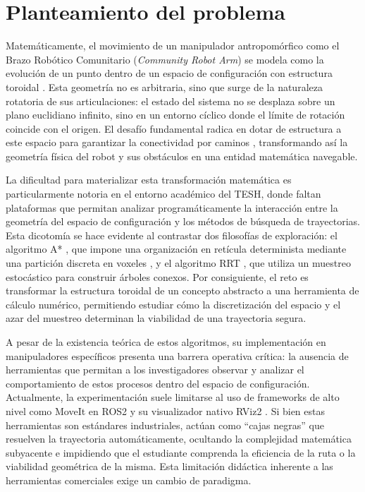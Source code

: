 \section{Planteamiento del problema}

Matemáticamente, el movimiento de un manipulador antropomórfico como el 
Brazo Robótico Comunitario (\textit{Community Robot Arm}) \parencite{community_robot_arm_20sffactory} se modela como la evolución de un punto dentro de un 
espacio de configuración con estructura toroidal \parencite{Munkres2000}. 
Esta geometría no es arbitraria, sino que surge de la naturaleza rotatoria 
de sus articulaciones: el estado del sistema no se desplaza sobre un plano 
euclidiano infinito, sino en un entorno cíclico donde el límite de rotación 
coincide con el origen. El desafío fundamental radica en dotar de estructura 
a este espacio para garantizar la conectividad 
por caminos \parencite{Munkres2000}, transformando así la geometría física 
del robot y sus obstáculos en una entidad matemática navegable.

La dificultad para materializar esta transformación matemática 
es particularmente notoria en el entorno académico del TESH, 
donde faltan plataformas que permitan analizar programáticamente 
la interacción entre la geometría del espacio de 
configuración y los métodos de búsqueda de trayectorias. Esta dicotomía 
se hace evidente al contrastar dos filosofías de exploración: el 
algoritmo A* \parencite{Hart1968}, que impone una organización en 
retícula determinista mediante una partición discreta en 
voxeles \parencite{Choset2005}, y el algoritmo RRT \parencite{LaValle1998}, 
que utiliza un muestreo estocástico para construir árboles conexos. 
Por consiguiente, el reto es transformar la estructura toroidal de un 
concepto abstracto a una herramienta de cálculo numérico, permitiendo 
estudiar cómo la discretización del espacio y el azar del muestreo determinan 
la viabilidad de una trayectoria segura.

A pesar de la existencia teórica de estos algoritmos, su implementación 
en manipuladores específicos presenta una barrera operativa crítica: 
la ausencia de herramientas que permitan a los investigadores observar 
y analizar el comportamiento de estos procesos dentro del espacio de 
configuración. Actualmente, la experimentación suele limitarse al uso de 
frameworks de alto nivel como MoveIt en ROS2 \parencite{macenski2022robot} y su visualizador nativo RViz2 \parencite{rviz2_software}. Si bien estas herramientas 
son estándares industriales, actúan como \enquote{cajas negras} que resuelven la 
trayectoria automáticamente, ocultando la complejidad matemática subyacente 
e impidiendo que el estudiante comprenda la eficiencia de la ruta o la 
viabilidad geométrica de la misma. Esta limitación didáctica inherente 
a las herramientas comerciales exige un cambio de paradigma.


